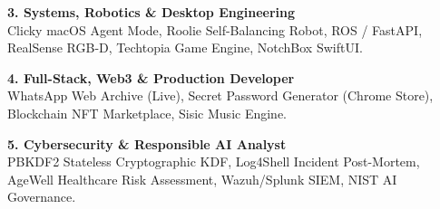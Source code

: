 \documentclass[10pt,a4paper]{article}
\begin{document}
\vspace{4pt}\noindent
\begin{minipage}[t]{0.485\textwidth}
\begin{tcolorbox}[enhanced, colback=conceptbg!30!white, colframe=concept!40!white, arc=3pt, boxrule=0.5pt, top=5pt, bottom=5pt, left=6pt, right=6pt]
  \textbf{\color{concept}3. Systems, Robotics \& Desktop Engineering}\\[2pt]
  {\scriptsize Clicky macOS Agent Mode, Roolie Self-Balancing Robot, ROS / FastAPI, RealSense RGB-D, Techtopia Game Engine, NotchBox SwiftUI.}
\end{tcolorbox}
\end{minipage}\hfill
\begin{minipage}[t]{0.485\textwidth}
\begin{tcolorbox}[enhanced, colback=prototypebg!30!white, colframe=prototype!40!white, arc=3pt, boxrule=0.5pt, top=5pt, bottom=5pt, left=6pt, right=6pt]
  \textbf{\color{prototype}4. Full-Stack, Web3 \& Production Developer}\\[2pt]
  {\scriptsize WhatsApp Web Archive (Live), Secret Password Generator (Chrome Store), Blockchain NFT Marketplace, Sisic Music Engine.}
\end{tcolorbox}
\end{minipage}

\vspace{4pt}\noindent
\begin{tcolorbox}[enhanced, colback=lightbg, colframe=cardborder, arc=3pt, boxrule=0.5pt, top=5pt, bottom=5pt, left=6pt, right=6pt]
  \textbf{\color{primary}5. Cybersecurity \& Responsible AI Analyst}\\[2pt]
  {\scriptsize PBKDF2 Stateless Cryptographic KDF, Log4Shell Incident Post-Mortem, AgeWell Healthcare Risk Assessment, Wazuh/Splunk SIEM, NIST AI Governance.}
\end{tcolorbox}
\end{document}
